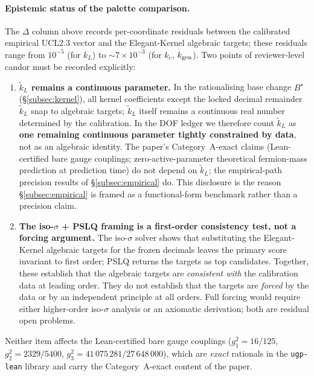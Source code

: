 \documentclass[11pt]{article}
\theoremstyle{remark}
\begin{document}
\begin{appendices}
\paragraph{Epistemic status of the palette comparison.}
The $\Delta$ column above records per-coordinate residuals between the calibrated empirical UCL2.3 vector and the Elegant-Kernel algebraic targets; these residuals range from $10^{-5}$ (for $k_L$) to $\sim 7 \times 10^{-3}$ (for $k_c$, $k_{\rm gen}$).  Two points of reviewer-level candor must be recorded explicitly:

\begin{enumerate}[leftmargin=1.2em,itemsep=0.25em]
  \item \textbf{$\tilde{k}_L$ remains a continuous parameter.}  In the rationalising base change $B^\star$ (\S\ref{subsec:kernel}), all kernel coefficients except the locked decimal remainder $\tilde{k}_L$ snap to algebraic targets; $\tilde{k}_L$ itself remains a continuous real number determined by the calibration.  In the DOF ledger we therefore count $\tilde{k}_L$ as \textbf{one remaining continuous parameter tightly constrained by data}, not as an algebraic identity.  The paper's Category~A-exact claims (Lean-certified bare gauge couplings; zero-active-parameter theoretical fermion-mass prediction at prediction time) do not depend on $\tilde{k}_L$; the empirical-path precision results of \S\ref{subsec:empirical} do.  This disclosure is the reason \S\ref{subsec:empirical} is framed as a functional-form benchmark rather than a precision claim.
  \item \textbf{The iso-$\sigma$ + PSLQ framing is a first-order consistency test, not a forcing argument.}  The iso-$\sigma$ solver shows that substituting the Elegant-Kernel algebraic targets for the frozen decimals leaves the primary score invariant to first order; PSLQ returns the targets as top candidates.  Together, these establish that the algebraic targets are \emph{consistent with} the calibration data at leading order.  They do not establish that the targets are \emph{forced} by the data or by an independent principle at all orders.  Full forcing would require either higher-order iso-$\sigma$ analysis or an axiomatic derivation; both are residual open problems.
\end{enumerate}
\noindent Neither item affects the Lean-certified bare gauge couplings ($g_1^2 = 16/125$, $g_2^2 = 2329/5400$, $g_3^2 = 41\,075\,281/27\,648\,000$), which are \emph{exact} rationals in the \texttt{ugp-lean} library and carry the Category~A-exact content of the paper.



\end{appendices}
\end{document}
